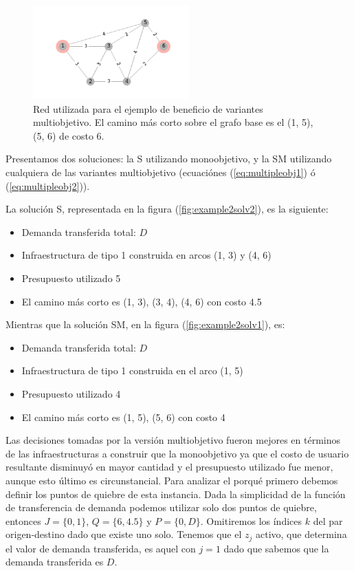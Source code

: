 \documentclass{article}
\begin{document}
  \begin{figure}[h!]
    \centering
    \includegraphics[width=6cm]{../resources/example_2_base.png}
      \caption{Red utilizada para el ejemplo de beneficio de variantes multiobjetivo. El camino más corto sobre el grafo base es el (1, 5), (5, 6) de costo 6.}
    \label{fig:example2base}
  \end{figure}

  Presentamos dos soluciones: la S utilizando monoobjetivo, y la SM utilizando cualquiera de las variantes multiobjetivo (ecuaciónes (\ref{eq:multipleobj1}) ó (\ref{eq:multipleobj2})).

  La solución S, representada en la figura (\ref{fig:example2solv2}), es la siguiente:

  \begin{itemize}
    \item{Demanda transferida total: $D$}
    \item{Infraestructura de tipo 1 construida en arcos (1, 3) y (4, 6)}
    \item{Presupuesto utilizado 5}
    \item{El camino más corto es (1, 3), (3, 4), (4, 6) con costo 4.5}
  \end{itemize}

  Mientras que la solución SM, en la figura (\ref{fig:example2solv1}), es:

  \begin{itemize}
    \item{Demanda transferida total: $D$}
    \item{Infraestructura de tipo 1 construida en el arco (1, 5)}
    \item{Presupuesto utilizado 4}
    \item{El camino más corto es (1, 5), (5, 6) con costo 4}
  \end{itemize}

  Las decisiones tomadas por la versión multiobjetivo fueron mejores en términos de las infraestructuras a construir que la monoobjetivo ya que el costo de usuario resultante disminuyó en mayor cantidad y el presupuesto utilizado fue menor, aunque esto último es circunstancial. Para analizar el porqué primero debemos definir los puntos de quiebre de esta instancia. Dada la simplicidad de la función de transferencia de demanda podemos utilizar solo dos puntos de quiebre, entonces $J = \{0, 1\}$, $Q = \{6, 4.5\}$ y $P = \{0, D\}$. Omitiremos los índices $k$ del par origen-destino dado que existe uno solo. Tenemos que el $z_j$ activo, que determina el valor de demanda transferida, es aquel con $j = 1$ dado que sabemos que la demanda transferida es $D$.
\end{document}
